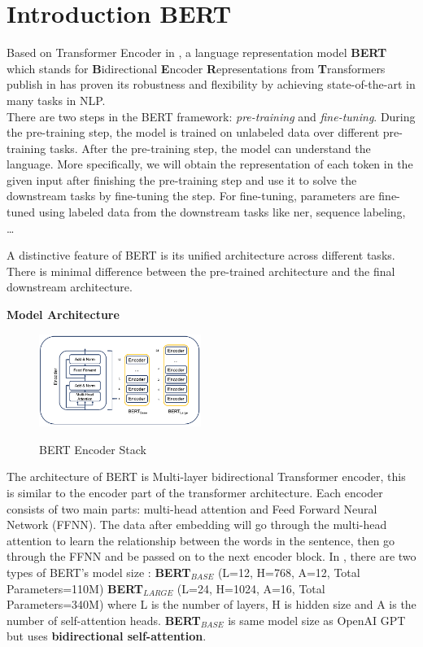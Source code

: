 \documentclass[11pt]{article}
\begin{document}
\section{Introduction BERT}
\quad Based on Transformer Encoder in \cite{devlin2018bert}, a language representation model \textbf{BERT} which stands for \textbf{B}idirectional \textbf{E}ncoder \textbf{R}epresentations  from \textbf{T}ransformers publish in \cite{vaswani2017attention} 
has proven its robustness and flexibility by achieving state-of-the-art in many tasks in NLP. \\

There are two steps in the BERT framework: \textit{pre-training} and \textit{fine-tuning}. During the pre-training step, the model is trained on unlabeled data over different pre-training tasks. After the pre-training step, the model can understand the language. More specifically, we will obtain the representation of each token in the given input after finishing the pre-training step and use it to solve the downstream tasks by fine-tuning the step. For fine-tuning, parameters are fine-tuned using labeled data from the downstream tasks like ner, sequence labeling, …

A distinctive feature of BERT is its unified architecture across different tasks. There is minimal difference between the pre-trained architecture and the final downstream architecture.

\textbf{Model Architecture}\\

\begin{figure}[h]
    \centering
    \includegraphics[width=0.47\textwidth]{BERT_model.png} \\
    \caption{BERT Encoder Stack} \cite{WinNT}
    \label{fig1}
\end{figure}


The architecture of BERT is Multi-layer bidirectional Transformer encoder, this is similar to the encoder part of the transformer architecture. Each encoder consists of two main parts: multi-head attention and Feed Forward Neural Network (FFNN). The data after embedding will go through the multi-head attention to learn the relationship between the words in the sentence, then go through the FFNN and be passed on to the next encoder block. In \cite{devlin2018bert}, there are two types of BERT's model size : 
\textbf{BERT}$_{BASE}$ (L=12, H=768, A=12, Total Parameters=110M) 
\textbf{BERT}$_{LARGE}$ (L=24, H=1024, A=16, Total Parameters=340M) where L is the number of layers, H is hidden size and A is the number of self-attention heads. \textbf{BERT}$_{BASE}$ is same model size as OpenAI GPT but uses \textbf{bidirectional self-attention}. \\
\end{document}
